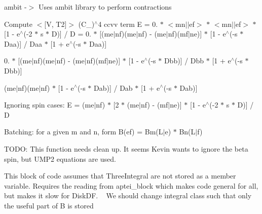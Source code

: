ambit -\/$>$ Uses ambit library to perform contractions 

Compute $<$\mbox{[}V, T2\mbox{]}$>$ (C\+\_)$^\wedge$4 ccvv term E = 0. $\ast$ $<$mn$\vert$$\vert$ef$>$ $\ast$ $<$mn$\vert$$\vert$ef$>$ $\ast$ \mbox{[}1 -\/ e$^\wedge$(-\/2 $\ast$ s $\ast$ D)\mbox{]} / D = 0. $\ast$ \mbox{[}(me$\vert$nf)(me$\vert$nf) -\/ (me$\vert$nf)(mf$\vert$ne)\mbox{]} $\ast$ \mbox{[}1 -\/ e$^\wedge$(-\/s $\ast$ Daa)\mbox{]} / Daa $\ast$ \mbox{[}1 + e$^\wedge$(-\/s $\ast$ Daa)\mbox{]} 


\begin{DoxyItemize}
\item 0. $\ast$ \mbox{[}(me$\vert$nf)(me$\vert$nf) -\/ (me$\vert$nf)(mf$\vert$ne)\mbox{]} $\ast$ \mbox{[}1 -\/ e$^\wedge$(-\/s $\ast$ Dbb)\mbox{]} / Dbb $\ast$ \mbox{[}1 + e$^\wedge$(-\/s $\ast$ Dbb)\mbox{]} 


\item (me$\vert$nf)(me$\vert$nf) $\ast$ \mbox{[}1 -\/ e$^\wedge$(-\/s $\ast$ Dab)\mbox{]} / Dab $\ast$ \mbox{[}1 + e$^\wedge$(-\/s $\ast$ Dab)\mbox{]}
\end{DoxyItemize}

Ignoring spin cases\+: E = (me$\vert$nf) $\ast$ \mbox{[}2 $\ast$ (me$\vert$nf) -\/ (mf$\vert$ne)\mbox{]} $\ast$ \mbox{[}1 -\/ e$^\wedge$(-\/2 $\ast$ s $\ast$ D)\mbox{]} / D

Batching\+: for a given m and n, form B(ef) = Bm(L$\vert$e) $\ast$ Bn(L$\vert$f)

T\+O\+DO\+: This function needs clean up. It seems Kevin wants to ignore the beta spin, but U\+M\+P2 equations are used.

This block of code assumes that Three\+Integral are not stored as a member variable. Requires the reading from aptei\+\_\+block which makes code general for all, but makes it slow for Disk\+DF. ~\newline
 We should change integral class such that only the useful part of B is stored \mbox{\label{classforte_1_1_t_h_r_e_e___d_s_r_g___m_r_p_t2_ab38abe60c8e786fdf3becd1fe6f8c70f}} 
